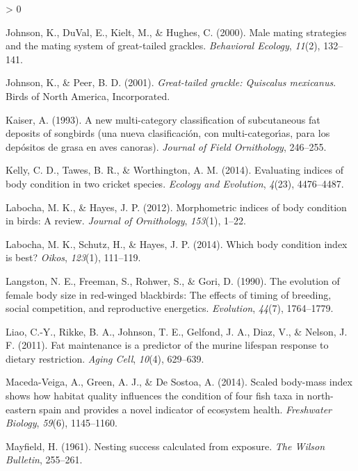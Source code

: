 \documentclass[
]{article}
\newlength{\cslhangindent}
\newenvironment{CSLReferences}[2] %
 {%
  \setlength{\parindent}{0pt}
  \ifodd #1 \everypar{\setlength{\hangindent}{\cslhangindent}}\ignorespaces\fi
  \ifnum #2 > 0
  \setlength{\parskip}{#2\baselineskip}
  \fi
 }%
 {}
\begin{document}
\begin{CSLReferences}{1}{0}
\leavevmode\hypertarget{ref-johnson2000male}{}%
Johnson, K., DuVal, E., Kielt, M., \& Hughes, C. (2000). Male mating
strategies and the mating system of great-tailed grackles.
\emph{Behavioral Ecology}, \emph{11}(2), 132--141.

\leavevmode\hypertarget{ref-johnson2001great}{}%
Johnson, K., \& Peer, B. D. (2001). \emph{Great-tailed grackle:
Quiscalus mexicanus}. Birds of North America, Incorporated.

\leavevmode\hypertarget{ref-kaiser1993new}{}%
Kaiser, A. (1993). A new multi-category classification of subcutaneous
fat deposits of songbirds (una nueva clasificaci{ó}n, con
multi-categor{ı́}as, para los dep{ó}sitos de grasa en aves canoras).
\emph{Journal of Field Ornithology}, 246--255.

\leavevmode\hypertarget{ref-kelly2014evaluating}{}%
Kelly, C. D., Tawes, B. R., \& Worthington, A. M. (2014). Evaluating
indices of body condition in two cricket species. \emph{Ecology and
Evolution}, \emph{4}(23), 4476--4487.

\leavevmode\hypertarget{ref-labocha2012morphometric}{}%
Labocha, M. K., \& Hayes, J. P. (2012). Morphometric indices of body
condition in birds: A review. \emph{Journal of Ornithology},
\emph{153}(1), 1--22.

\leavevmode\hypertarget{ref-labocha2014body}{}%
Labocha, M. K., Schutz, H., \& Hayes, J. P. (2014). Which body condition
index is best? \emph{Oikos}, \emph{123}(1), 111--119.

\leavevmode\hypertarget{ref-langston1990evolution}{}%
Langston, N. E., Freeman, S., Rohwer, S., \& Gori, D. (1990). The
evolution of female body size in red-winged blackbirds: The effects of
timing of breeding, social competition, and reproductive energetics.
\emph{Evolution}, \emph{44}(7), 1764--1779.

\leavevmode\hypertarget{ref-liao2011fat}{}%
Liao, C.-Y., Rikke, B. A., Johnson, T. E., Gelfond, J. A., Diaz, V., \&
Nelson, J. F. (2011). Fat maintenance is a predictor of the murine
lifespan response to dietary restriction. \emph{Aging Cell},
\emph{10}(4), 629--639.

\leavevmode\hypertarget{ref-maceda2014scaled}{}%
Maceda-Veiga, A., Green, A. J., \& De Sostoa, A. (2014). Scaled
body-mass index shows how habitat quality influences the condition of
four fish taxa in north-eastern spain and provides a novel indicator of
ecosystem health. \emph{Freshwater Biology}, \emph{59}(6), 1145--1160.

\leavevmode\hypertarget{ref-mayfield1961nesting}{}%
Mayfield, H. (1961). Nesting success calculated from exposure. \emph{The
Wilson Bulletin}, 255--261.


\end{CSLReferences}
\end{document}
